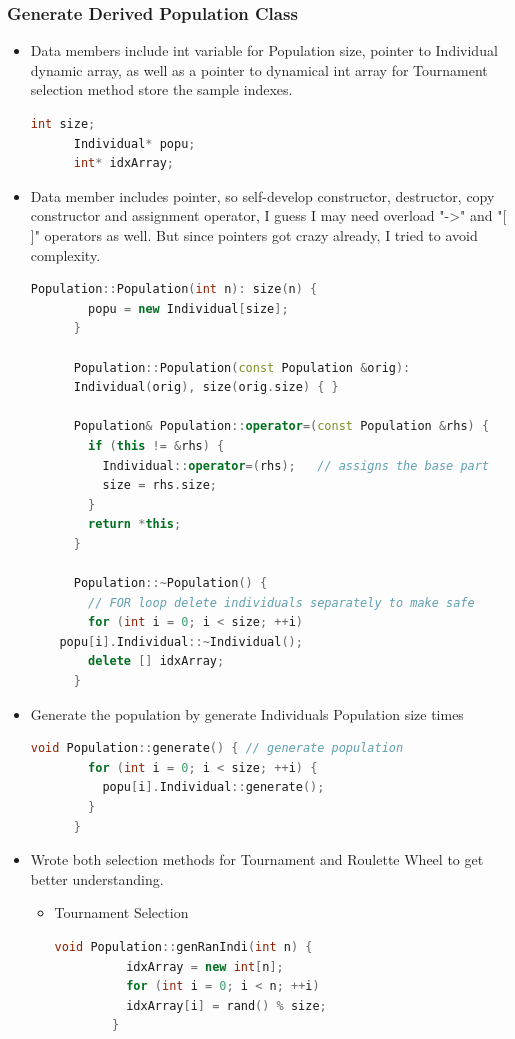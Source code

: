 \documentclass{article}
\begin{document}
\begin{CJK}{UTF8}{gbsn}
\subsubsection{Generate Derived Population Class}
  \begin{itemize}
    \itemsep=-3pt

  \item Data members include int variable for Population size, pointer to Individual dynamic array, as well as a pointer to dynamical int array for Tournament selection method store the sample indexes. 
    \begin{lstlisting}[language=c++]
      int size;
      Individual* popu;
      int* idxArray;
    \end{lstlisting}

  \item Data member includes pointer, so self-develop constructor, destructor, copy constructor and assignment operator, I guess I may need overload "->" and "[ ]" operators as well. But since pointers got crazy already, I tried to avoid complexity. 
    \begin{lstlisting}[language=c++]
      Population::Population(int n): size(n) {
        popu = new Individual[size];
      }

      Population::Population(const Population &orig):
      Individual(orig), size(orig.size) { }

      Population& Population::operator=(const Population &rhs) {
        if (this != &rhs) {
          Individual::operator=(rhs);   // assigns the base part
          size = rhs.size;
        }
        return *this;
      }

      Population::~Population() {
        // FOR loop delete individuals separately to make safe
        for (int i = 0; i < size; ++i) 
	popu[i].Individual::~Individual();	 
        delete [] idxArray;
      }
    \end{lstlisting}

  \item Generate the population by generate Individuals Population size times
    \begin{lstlisting}[language=c++]
      void Population::generate() { // generate population
        for (int i = 0; i < size; ++i) {
          popu[i].Individual::generate();
        }
      }
    \end{lstlisting}

  \item Wrote both selection methods for Tournament and Roulette Wheel to get better understanding. 
    \begin{itemize}
      \itemsep=-3pt
    \item Tournament Selection
      \begin{lstlisting}[language=c++]
        void Population::genRanIndi(int n) {
          idxArray = new int[n];
          for (int i = 0; i < n; ++i) 
          idxArray[i] = rand() % size;
        }


\end{lstlisting}
\end{itemize}
\end{itemize}
\end{CJK}
\end{document}
